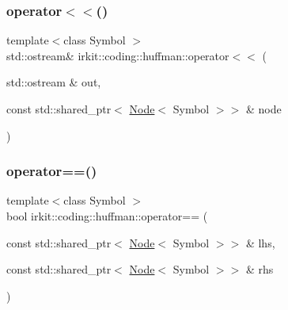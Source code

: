 \mbox{\label{namespaceirkit_1_1coding_1_1huffman_aaee845163a3d96e6dab75655f5a7dce4}} 
\subsubsection{\texorpdfstring{operator$<$$<$()}{operator<<()}}
{\footnotesize\ttfamily template$<$class Symbol $>$ \\
std\+::ostream\& irkit\+::coding\+::huffman\+::operator$<$$<$ (\begin{DoxyParamCaption}\item[{std\+::ostream \&}]{out,  }\item[{const std\+::shared\+\_\+ptr$<$ \mbox{\hyperlink{structirkit_1_1coding_1_1huffman_1_1Node}{Node}}$<$ Symbol $>$$>$ \&}]{node }\end{DoxyParamCaption})}

\mbox{\label{namespaceirkit_1_1coding_1_1huffman_a38c31c94fea7c10dc0ba13625b44a2b2}} 
\subsubsection{\texorpdfstring{operator==()}{operator==()}}
{\footnotesize\ttfamily template$<$class Symbol $>$ \\
bool irkit\+::coding\+::huffman\+::operator== (\begin{DoxyParamCaption}\item[{const std\+::shared\+\_\+ptr$<$ \mbox{\hyperlink{structirkit_1_1coding_1_1huffman_1_1Node}{Node}}$<$ Symbol $>$$>$ \&}]{lhs,  }\item[{const std\+::shared\+\_\+ptr$<$ \mbox{\hyperlink{structirkit_1_1coding_1_1huffman_1_1Node}{Node}}$<$ Symbol $>$$>$ \&}]{rhs }\end{DoxyParamCaption})}

\mbox{\label{namespaceirkit_1_1coding_1_1huffman_a33965c3f1355d6c9744141f482ba0d89}} 
